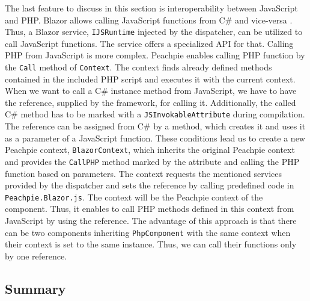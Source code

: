 The last feature to discuss in this section is interoperability between JavaScript and PHP.
Blazor allows calling JavaScript functions from C\# \cite{online:interop1} and vice-versa \cite{online:interop2}.
Thus, a Blazor service, \texttt{IJSRuntime} injected by the dispatcher, can be utilized to call JavaScript functions.
The service offers a specialized API for that.
Calling PHP from JavaScript is more complex.
Peachpie enables calling PHP function by the \texttt{Call} method of \texttt{Context}. 
The context finds already defined methods contained in the included PHP script and executes it with the current context.
When we want to call a C\# instance method from JavaScript, we have to have the reference, supplied by the framework, for calling it.
Additionally, the called C\# method has to be marked with a \texttt{JSInvokableAttribute} during compilation.
The reference can be assigned from C\# by a method, which creates it and uses it as a parameter of a JavaScript function.
These conditions lead us to create a new Peachpie context, \texttt{BlazorContext}, which inherits the original Peachpie context and provides the \texttt{CallPHP} method marked by the attribute and calling the PHP function based on parameters.
The context requests the mentioned services provided by the dispatcher and sets the reference by calling predefined code in \texttt{Peachpie.Blazor.js}.
The context will be the Peachpie context of the component.
Thus, it enables to call PHP methods defined in this context from JavaScript by using the reference.
The advantage of this approach is that there can be two components inheriting \texttt{PhpComponent} with the same context when their context is set to the same instance.
Thus, we can call their functions only by one reference.

\subsection{Summary}

